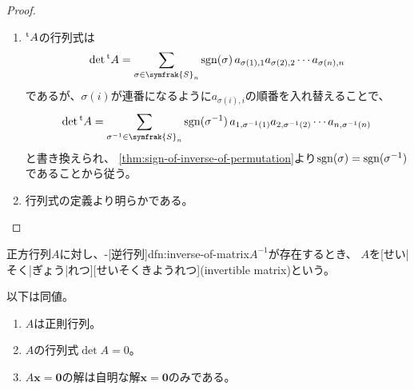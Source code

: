 \documentclass[../sotsu.tex]{subfiles}
\begin{document}
\begin{proof}
    \begin{enumerate}
        \item ${}^{\mathrm{t}}A$の行列式は
            \[  \det \tp{A} = \sum_{\sigma \in \symfrak{S}_n} \sgn(\sigma) \, a_{\sigma(1), 1} a_{\sigma(2), 2} \dotsm a_{\sigma(n), n}  \]
            であるが、$\sigma(i)$が連番になるように$a_{\sigma(i), i}$の順番を入れ替えることで、
            \[  \det \tp{A} = \sum_{\sigma^{-1} \in \symfrak{S}_n} \sgn(\sigma^{-1}) \, a_{1, \sigma^{-1}(1)} a_{2, \sigma^{-1}(2)} \dotsm a_{n, \sigma^{-1}(n)}  \]
            と書き換えられ、
            \cref{thm:sign-of-inverse-of-permutation}より$\operatorname{sgn}(\sigma) = \operatorname{sgn}(\sigma^{-1})$であることから従う。
        \item 行列式の定義より明らかである。
    \end{enumerate}
\end{proof}

\begin{definition}
    \label{dfn:invertible-matrix}
    正方行列$A$に対し、-[逆行列]{dfn:inverse-of-matrix}$A^{-1}$が存在するとき、
    $A$を[せい|そく|ぎょう|れつ][せいそくきようれつ](invertible matrix)という。
\end{definition}

\begin{proposition}
    以下は同値。
    \begin{enumerate}
        \item $A$は正則行列。
        \item $A$の行列式$\det A = 0$。
        \item $A \symbf{x} = \symbf{0}$の解は自明な解$\symbf{x} = \symbf{0}$のみである。
    \end{enumerate}
\end{proposition}
\end{document}
